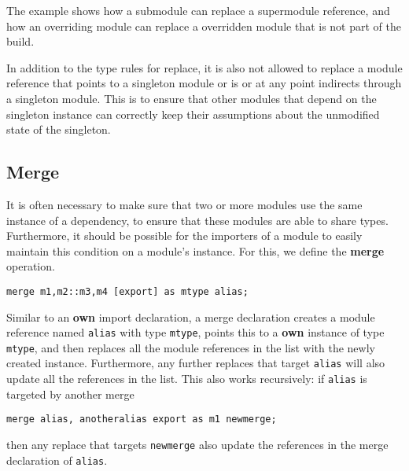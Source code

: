 The example shows how a submodule can replace a supermodule
reference, and how an overriding module can replace a overridden module
that is not part of the build.

In addition to the type rules for replace, it is also not allowed to 
replace a module reference that points to a singleton module or
is or at any point indirects through a singleton module. This is to ensure that other
modules that depend on the singleton instance can correctly keep their
assumptions about the unmodified state of the singleton.



\subsection{Merge}

It is often necessary to make sure that two or more modules use the same
instance of a dependency, to ensure that these
modules are able to share types. Furthermore, it should be possible for
the importers of a module to easily maintain this condition on a module's
instance. For this, we define the \textbf{merge} operation.

\begin{lstlisting}
merge m1,m2::m3,m4 [export] as mtype alias;
\end{lstlisting}

Similar to an \textbf{own} import declaration, a merge declaration creates
a module reference named \texttt{alias} with type \texttt{mtype},
points this to a \textbf{own} instance of type \texttt{mtype}, and then replaces all
the module references in the list with the newly created instance. Furthermore,
any further replaces that target \texttt{alias} will also update all
the references in the list. This also works recursively: if \texttt{alias}
is targeted by another merge 
\begin{lstlisting}
merge alias, anotheralias export as m1 newmerge;
\end{lstlisting}
then any replace that targets \texttt{newmerge} also update the references
in the merge declaration of \texttt{alias}.

